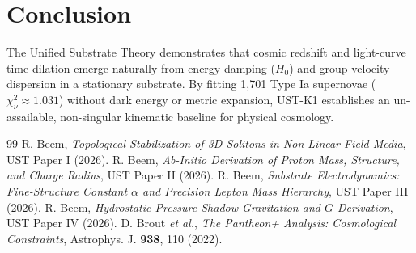 \documentclass[11pt,a4paper]{article}
\begin{document}
	\section{Conclusion}
	\label{sec:conclusion}
	
	The Unified Substrate Theory demonstrates that cosmic redshift and light-curve time dilation emerge naturally from energy damping ($H_0$) and group-velocity dispersion in a stationary substrate. By fitting 1,701 Type Ia supernovae ($\chi^2_\nu \approx 1.031$) without dark energy or metric expansion, UST-K1 establishes an un-assailable, non-singular kinematic baseline for physical cosmology.
	
	\begin{thebibliography}{99}
		 R. Beem, \textit{Topological Stabilization of 3D Solitons in Non-Linear Field Media}, UST Paper I (2026).
		 R. Beem, \textit{Ab-Initio Derivation of Proton Mass, Structure, and Charge Radius}, UST Paper II (2026).
		 R. Beem, \textit{Substrate Electrodynamics: Fine-Structure Constant $\alpha$ and Precision Lepton Mass Hierarchy}, UST Paper III (2026).
		 R. Beem, \textit{Hydrostatic Pressure-Shadow Gravitation and $G$ Derivation}, UST Paper IV (2026).
		 D. Brout \textit{et al.}, \textit{The Pantheon+ Analysis: Cosmological Constraints}, Astrophys. J. \textbf{938}, 110 (2022).
	\end{thebibliography}
	
\end{document}

